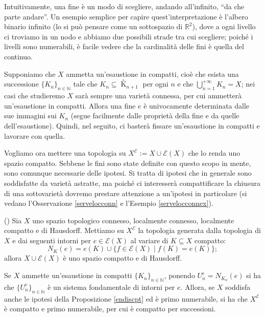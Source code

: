 Intuitivamente, una fine è un modo di scegliere, andando all'infinito, ``da che parte andare''. Un esempio semplice per capire quest'interpretazione è l'albero binario infinito (lo si può pensare come un sottospazio di $\mathbb{R}^2$), dove a ogni livello ci troviamo in un nodo e abbiamo due possibili strade tra cui scegliere; poiché i livelli sono numerabili, è facile vedere che la cardinalità delle fini è quella del continuo.

\begin{oss}
    Supponiamo che $X$ ammetta un'esaustione in compatti, cioè che esista una successione $\{K_n\}_{n\in\mathbb{N}}$ tale che $K_n\subseteq{\mathop K\limits^ \circ}_{n+1}$ per ogni $n$ e che $\displaystyle\bigcup_{n=1}^{+\infty} K_n=X$; nei casi che studieremo $X$ sarà sempre una varietà connessa, per cui ammetterà un'esaustione in compatti. Allora una fine $e$ è univocamente determinata dalle sue immagini sui $K_n$ (segue facilmente dalle proprietà della fine e da quelle dell'esaustione). Quindi, nel seguito, ci basterà fissare un'esaustione in compatti e lavorare con quella.
\end{oss}

Vogliamo ora mettere una topologia su $X^\mathcal{E}:=X\cup\mathcal{E}(X)$ che lo renda uno spazio compatto. Sebbene le fini sono state definite con questo scopo in mente, sono comunque necessarie delle ipotesi. Si tratta di ipotesi che in generale sono soddisfatte da varietà astratte, ma poiché ci interesserà compattificare la chiusura di una sottovarietà dovremo prestare attenzione a un'ipotesi in particolare (si vedano l'Osservazione \ref{servelocconn} e l'Esempio \ref{servelocconnex}).

\begin{prop} \label{endiscpt}
    (\cite[Chapter 1, Problem 19]{Sp}) Sia $X$ uno spazio topologico connesso, localmente connesso, localmente compatto e di Hausdorff. Mettiamo su $X^\mathcal{E}$ la topologia generata dalla topologia di $X$ e dai seguenti intorni per $e\in\mathcal{E}(X)$ al variare di $K\subseteq X$ compatto:
    $$N_K(e)=e(K)\cup\{f\in\mathcal{E}(X)\mid f(K)=e(K)\};$$
    allora $X\cup\mathcal{E}(X)$ è uno spazio compatto e di Hausdorff.
\end{prop}

\begin{oss} \label{endiscptsucc}
    Se $X$ ammette un'esaustione in compatti $\{K_n\}_{n\in\mathbb{N}}$, ponendo $U_n^e=N_{K_n}(e)$ si ha che $\{U_n^e\}_{n\in\mathbb{N}}$ è un sistema fondamentale di intorni per $e$. Allora, se $X$ soddisfa anche le ipotesi della Proposizione \ref{endiscpt} ed è primo numerabile, si ha che $X^\mathcal{E}$ è compatto e primo numerabile, per cui è compatto per successioni.
\end{oss}

